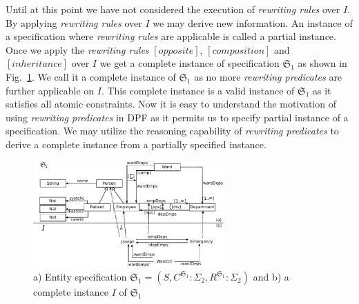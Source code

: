 \documentclass{eceasst}
\begin{document}
Until at this point we have not considered the execution of \textit{rewriting rules} over $I$. 
By applying \textit{rewriting rules} over $I$ we may derive new information. 
An instance of a specification where \textit{rewriting rules} are applicable is called a partial instance. 
Once we apply the \textit{rewriting rules} $[opposite]$, $[composition]$ and $[inheritance]$ over $I$ we get a complete instance of specification $\mathfrak{S}_1$ as shown in 
Fig.~\ref{fig:entity-1-full}. We call it a complete instance of $\mathfrak{S}_1$ as no more \textit{rewriting predicates} are further applicable on $I$. 
This complete instance is a valid instance of $\mathfrak{S}_1$ as it satisfies all atomic constraints. 
Now it is easy to understand the motivation of using \textit{rewriting predicates} in DPF as it permits us to specify partial instance of a specification. 
We may utilize the reasoning capability of \textit{rewriting predicates} to derive a complete instance from a partially specified instance. 



\begin{figure}[h]
\centering
 \includegraphics[width=0.65\textwidth]{entity-1-full.pdf}
 \caption{ a) Entity specification $\mathfrak{S}_1 = (S, C^{\mathfrak{S}_1} : \Sigma_2,  R^{\mathfrak{S}_1} : \Sigma_2)$ and  b) a complete instance $I$ of $\mathfrak{S}_1$}
 \label{fig:entity-1-full}
 \end{figure}
\end{document}
